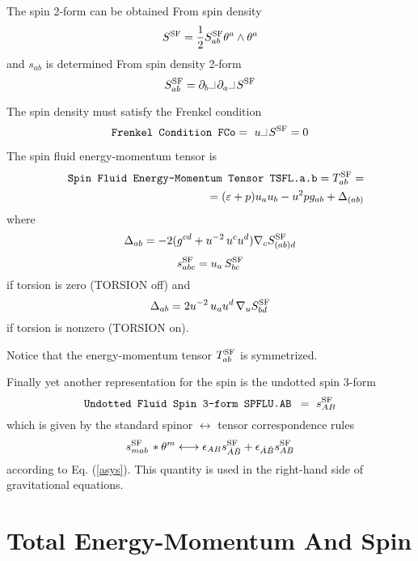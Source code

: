 \documentclass[twoside,openright]{report}
\newcommand{\grgtt}{\ttfamily}
\newcommand{\object}[2]{%
\begin{equation}
\mbox{\comm{#1}} =\ #2
\end{equation}}
\newcommand{\tsst}{\longleftrightarrow}
\newcommand{\ipr}{\rule{1.8mm}{.1mm}\rule{.1mm}{2.2mm}\,} %
\newcommand{\pref}[1]{page \pageref{#1}}
\newcommand{\seethis}[1]{\marginpar{\footnotesize\it #1}}
\renewcommand{\tt}{\grgtt}
\newcommand{\comm}[1]{{\upshape\tt#1}}    %
\begin{document}
The spin 2-form can be obtained {\tt From spin density}
\begin{equation}
S^{\rm SF}=\frac{1}{2}S^{\rm SF}_{ab} \theta^a\wedge\theta^a
\end{equation}
and $s_{ab}$ is determined {\tt From spin density 2-form}
\begin{equation}
S^{\rm SF}_{ab}= \partial_b\ipr\partial_a\ipr S^{\rm SF}
\end{equation}

The spin density must satisfy the Frenkel condition
\object{Frenkel Condition FCo}{u\ipr S^{\rm SF}=0}

The spin fluid energy-momentum tensor is
\begin{eqnarray}
&&\mbox{\tt Spin Fluid Energy-Momentum Tensor TSFL.a.b}=T^{\rm SF}_{ab}=
\nonumber\\
&&\qquad\qquad=(\varepsilon+p)u_a u_b - u^2p g_{ab}+\Delta_{(ab)}
\end{eqnarray}
where
\begin{equation}
\Delta_{ab}=-2(g^{cd}+u^{-2}\,u^cu^d) \nabla_c S^{\rm SF}_{(ab)d}
\end{equation}
\begin{equation}
s^{\rm SF}_{abc}=u_a\,S^{\rm SF}_{bc}
\end{equation}
if torsion is zero (\comm{TORSION} off) and
\begin{equation}
\Delta_{ab}=2u^{-2}\,u_au^d\,\nabla_u S^{\rm SF}_{bd}
\end{equation}
if torsion is nonzero (\comm{TORSION} on).

Notice that the energy-momentum \seethis{See \pref{tsym}.}
tensor $T^{\rm SF}_{ab}$ is symmetrized.

Finally yet another representation for the spin
is the undotted spin 3-form
\object{Undotted Fluid Spin 3-form SPFLU.AB }{s^{\rm SF}_{AB}}
which is given by the standard spinor $\tsst$ tensor correspondence rules
\begin{equation}
 s^{\rm SF}_{mab}\,*\theta^m \tsst \epsilon_{AB} s^{\rm SF}_{\dot A\dot B}
+ \epsilon_{\dot A\dot B}s^{\rm SF}_{AB}
\end{equation}
according to Eq. (\ref{asys}). \seethis{See \pref{asys}.}
This quantity is used in the right-hand side of gravitational equations.

\section{Total Energy-Momentum And Spin}
\label{totalc}
\end{document}
